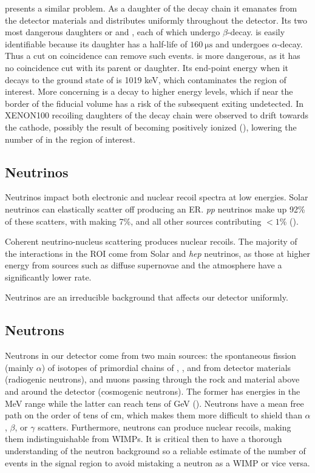  presents a similar problem.  As a daughter of the  decay chain it emanates from the detector materials and
distributes
uniformly throughout the detector.  Its two most dangerous daughters or \leadtwofourteen and , each of which
undergo $\beta$-decay.   is easily identifiable because its daughter \poloniumtwofourteen has a half-life of
$160\ \mathrm{\mu s}$ and undergoes $\alpha$-decay.  Thus a cut on coincidence can remove such events.  \leadtwofourteen is more
dangerous, as it has no coincidence cut with its parent or daughter.  Its end-point energy when it decays to the ground state of
\bismuthtwofourteen is 1019 keV, which contaminates the region of interest.  More concerning is a decay to higher energy levels, which
if near the border of the fiducial volume has a risk of the subsequent \gammaray exiting undetected.  In XENON100 recoiling daughters of
the  decay chain were observed to drift towards the cathode, possibly the result of becoming positively ionized
(), lowering the number of \betadecays in the region of interest.


\subsection{Neutrinos}
\label{subsec:neutrinos}
Neutrinos impact both electronic and nuclear recoil spectra at low energies.  Solar neutrinos can elastically scatter off \electron
producing an ER.  \textit{pp} neutrinos make up 92\% of these scatters, with  making 7\%, and all other sources contributing
$<1$\% ().

Coherent neutrino-nucleus scattering produces nuclear recoils.  The majority of the interactions in the ROI come from Solar 
and \textit{hep} neutrinos, as those at higher energy from sources such as diffuse supernovae and the atmosphere have a significantly
lower rate.

Neutrinos are an irreducible background that affects our detector uniformly.


\subsection{Neutrons}
\label{subsec:neutrons}
Neutrons in our detector come from two main sources: the spontaneous fission (mainly $\alpha$) of isotopes of primordial chains of
\uranium, , and  from detector materials (radiogenic neutrons), and muons
passing through the rock and material above and around the detector (cosmogenic neutrons).  The former has energies in the MeV range
while the latter can reach tens of GeV ().  Neutrons have a mean free path on the order of tens of cm, which makes
them more difficult to shield than $\alpha$, $\beta$, or $\gamma$ scatters.  Furthermore, neutrons can produce nuclear recoils, making
them indistinguishable from WIMPs.  It is critical then to have a thorough understanding of the neutron background so a reliable
estimate of the number of events in the signal region to avoid mistaking a neutron as a WIMP or vice versa.

